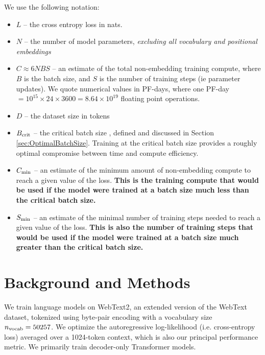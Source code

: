 \documentclass[english]{article}
\begin{document}
We use the following notation:
\begin{itemize}
\item $L$ -- the cross entropy loss in nats.
\item $N$ -- the number of model parameters, \emph{excluding all vocabulary and positional embeddings}  
\item $C \approx 6 N B S$ -- an estimate of the total non-embedding training compute, where $B$ is the batch size, and $S$ is the number of training steps (ie parameter updates). We quote numerical values in PF-days, where one PF-day $ = 10^{15} \times 24 \times 3600 = 8.64 \times 10^{19}$ floating point operations.  
\item $D$ -- the dataset size in tokens
\item $B_{\rm crit}$ -- the critical batch size \cite{1812.06162}, defined and discussed in Section \ref{sec:OptimalBatchSize}.  Training at the critical batch size provides a roughly optimal compromise between time and compute efficiency.
\item $C_{\rm min}$ -- an estimate of the minimum amount of non-embedding compute to reach a given value of the loss.  \textbf{This is the training compute that would be used if the model were trained at a batch size much less than the critical batch size.}  
\item $S_{\rm min}$ -- an estimate of the minimal number of training steps needed to reach a given value of the loss.  \textbf{This is also the number of training steps that would be used if the model were trained at a batch size much greater than the critical batch size.}
\end{itemize}


\section{Background and Methods}

We train language models on WebText2, an extended version of the WebText \cite{radford2019language} dataset, tokenized using byte-pair encoding \cite{BPE} with a vocabulary size $n_{\rm vocab} = 50257$.  We optimize the autoregressive log-likelihood (i.e. cross-entropy loss) averaged over a 1024-token context, which is also our principal performance metric.  We primarily train decoder-only \cite{liu2018generating, radford2018improving} Transformer \cite{OriginalTransformer} models.
\end{document}
